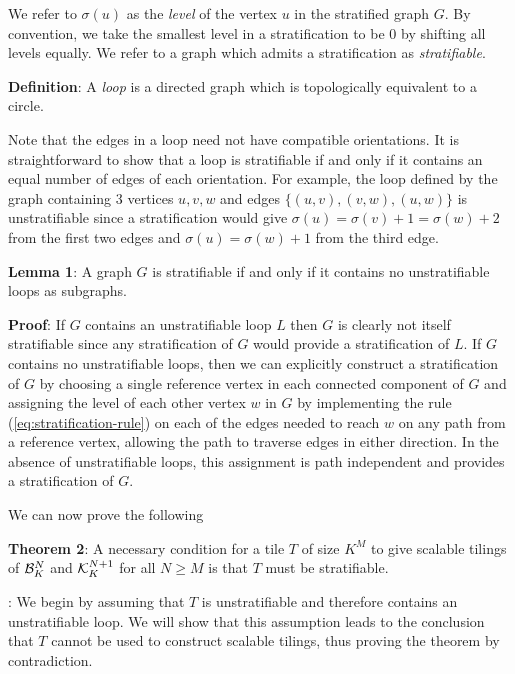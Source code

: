 \documentclass[12pt]{article}
\begin{document}
We refer to $\sigma (u)$ as the {\it level} of the vertex $u$ in the
stratified graph $G$.  By convention, we take the smallest level in a
stratification to be 0 by shifting all levels equally.
We refer to a graph which admits a stratification as {\it stratifiable}.
\vspace*{0.1in}

\noindent
{\bf Definition}: A {\it loop} is a directed graph
which is topologically equivalent to a circle.
\vspace*{0.1in}

Note that the edges in a loop need not have compatible orientations.
It is straightforward to show that a loop is stratifiable if and only
if it contains an equal number of edges of each orientation.
For example, the loop defined by the graph containing 3 vertices $u,
v, w$ and edges $\{(u, v), (v, w), (u, w)\}$ is unstratifiable since a
stratification would give
$\sigma (u) = \sigma (v) + 1 = \sigma (w) + 2$ from the first two
edges and $\sigma (u) = \sigma (w) + 1$ from the third edge.


\vspace*{0.1in}
\noindent
{\bf  Lemma 1}: A graph $G$ is stratifiable if and only if it contains
no unstratifiable loops as subgraphs.


\vspace*{0.1in}
\noindent
{\bf Proof}: If $G$ contains an unstratifiable loop $L$ then $G$ is
clearly not itself stratifiable since any stratification of $G$ would
provide a stratification of $L$.  If $G$ contains no unstratifiable
loops, then we can explicitly construct a stratification of $G$ by
choosing a single reference vertex in each connected component of $G$
and assigning the level of each other vertex $w$ in $G$ by
implementing the rule (\ref{eq:stratification-rule}) on each of the
edges needed to reach $w$ on any path from a reference vertex,
allowing the path to traverse edges in either direction.  In the
absence of unstratifiable loops, this assignment is path independent
and provides a stratification of $G$.
\vspace*{0.1in}

We can now prove the following
\vspace*{0.1in}

\noindent
{\bf Theorem 2}: A necessary condition for a tile $T$ of size $K^{M}$
to give scalable tilings of ${\cal B}_K^N$ and ${\cal K}_K^{N + 1}$
for all $N \geq M$ is that $T$ must be stratifiable.


\vspace*{0.1in} :
We begin by assuming that $T$ is unstratifiable and therefore
contains an unstratifiable loop.  We will show that this assumption
leads to the conclusion that $T$ cannot be used to construct
scalable tilings, thus proving the theorem by contradiction.
\end{document}
